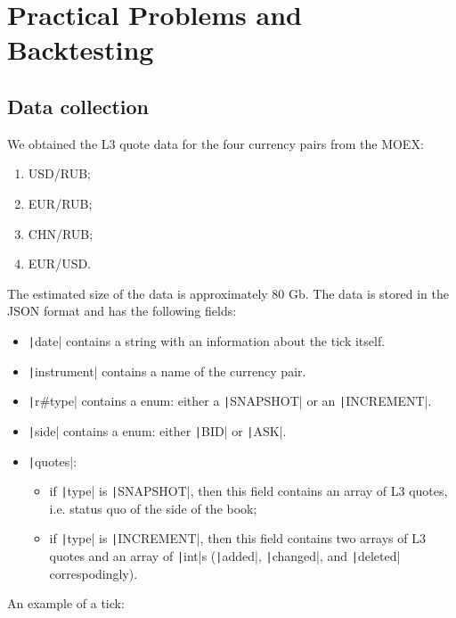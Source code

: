 \section{Practical Problems and Backtesting}
    \subsection{Data collection}
        We obtained the L3 quote data for the four currency pairs from the MOEX:
        \begin{enumerate}
            \item USD/RUB; 
            \item EUR/RUB; 
            \item CHN/RUB;
            \item EUR/USD.
        \end{enumerate} 
        The estimated size of the data is approximately 80 Gb. The data is stored in the JSON format and has the following fields:
        \begin{itemize}
            \item \texttt|date| contains a string with an information about the tick itself.
            \item \texttt|instrument| contains a name of the currency pair.
            \item \texttt|r#type| contains a enum: either a \texttt|SNAPSHOT| or an \texttt|INCREMENT|.
            \item \texttt|side| contains a enum: either \texttt|BID| or \texttt|ASK|.
            \item \texttt|quotes|:
                \begin{itemize}
                    \item if \texttt|type| is \texttt|SNAPSHOT|, then this field contains an array of L3 quotes, i.e. status quo of the side of the book;
                    \item if \texttt|type| is \texttt|INCREMENT|, then this field contains two arrays of L3 quotes and an array of \texttt|int|s (\texttt|added|, \texttt|changed|, and \texttt|deleted| correspodingly).
                \end{itemize}
        \end{itemize}
        An example of a tick: \inputminted{json}{codeminted/l3quote.json}

